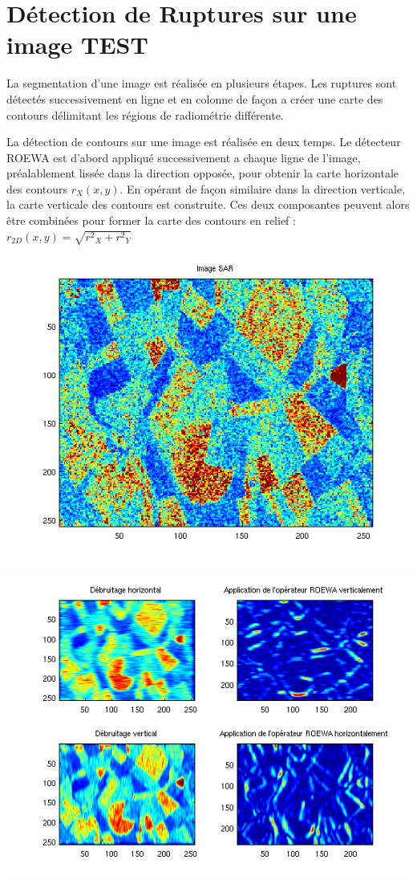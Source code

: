 \documentclass[a4paper,11pt]{article}
\newcommand{\FSource}[1]{%
  
  }
\begin{document}
\newpage

\section{Détection de Ruptures sur une image TEST}

La segmentation d'une image est réalisée en plusieurs étapes. Les ruptures sont détectés
successivement en ligne et en colonne de façon a créer une carte des contours délimitant
les régions de radiométrie différente.

La détection de contours sur une image est réalisée en deux temps. Le détecteur
ROEWA est d'abord appliqué successivement a chaque ligne de l'image, préalablement
lissée dans la direction opposée, pour obtenir la carte horizontale des contours $r_X (x, y)$.
En opérant de façon similaire dans la direction verticale, la carte verticale des contours
est construite. Ces deux composantes peuvent alors être combinées pour former la carte
des contours en relief : $r_{2D}(x,y)=\sqrt{{r^2}_X+{r^2}_Y}$

\vspace{0.5cm}
\FSource{matlab4/1.m}
\vspace{0.5cm}
\includegraphics[width=15cm]{capture4/partie4_02.png}
\vspace{0.5cm}
\FSource{matlab4/2.m}
\includegraphics[width=15cm]{capture4/partie4_06.png}
\vspace{0.5cm}
\FSource{matlab4/3.m}
\end{document}

